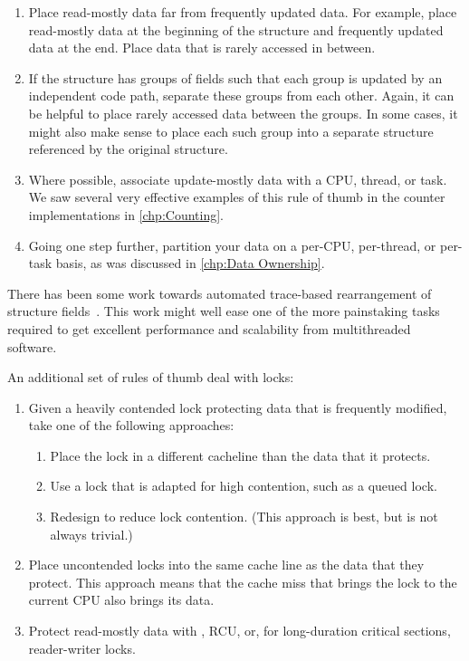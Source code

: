\begin{enumerate}
\item	Place read-mostly data far from frequently updated data.
	For example, place read-mostly data at the beginning of the
	structure and frequently updated data at the end.
	Place data that is rarely accessed in between.
\item	If the structure has groups of fields such that each group is
	updated by an independent code path, separate these groups
	from each other.
	Again, it can be helpful to place rarely accessed data
	between the groups.
	In some cases, it might also make sense to place each such group
	into a separate structure referenced by the original structure.
\item	Where possible, associate update-mostly data with a CPU, thread,
	or task.
	We saw several very effective examples of this rule of thumb
	in the counter implementations in
	\cref{chp:Counting}.
\item	Going one step further, partition your data on a per-CPU,
	per-thread, or per-task basis, as was discussed in
	\cref{chp:Data Ownership}.
\end{enumerate}

There has been some work towards automated trace-based rearrangement
of structure
fields~\cite{Golovanevsky:2010:TDL:2174824.2174835}.
This work might well ease one of the more painstaking tasks
required to get excellent performance and scalability from
multithreaded software.

An additional set of rules of thumb deal with locks:

\begin{enumerate}
\item	Given a heavily contended lock protecting data that is
	frequently modified, take one of the following approaches:
	\begin{enumerate}
	\item	Place the lock in a different cacheline than the data
		that it protects.
	\item	Use a lock that is adapted for high contention, such
		as a queued lock.
	\item	Redesign to reduce lock contention.
		(This approach is best, but is not always trivial.)
	\end{enumerate}
\item	Place uncontended locks into the same cache line as the data
	that they protect.
	This approach means that the cache miss that brings the
	lock to the current CPU also brings its data.
\item	Protect read-mostly data with , RCU, or, for
	long-duration critical sections, reader-writer locks.
\end{enumerate}

